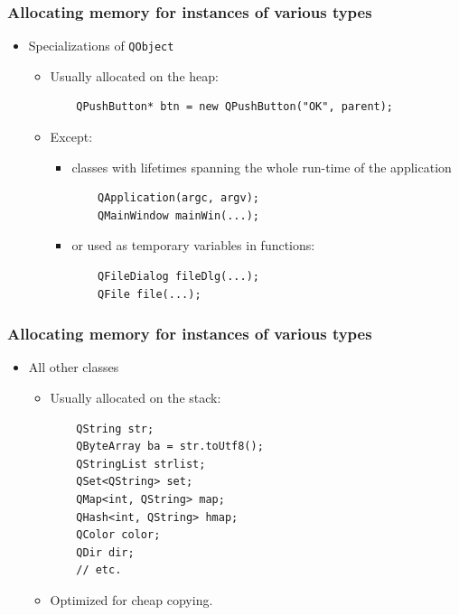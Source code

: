 \begin{frame}[fragile]
  \frametitle{Allocating memory for instances of various types}
  \small
  \begin{itemize}
    \item Specializations of \texttt{QObject}
    \begin{itemize}
      \item Usually allocated on the heap:
      \begin{verbatim}
	QPushButton* btn = new QPushButton("OK", parent);
      \end{verbatim}
      \item Except:
      \begin{itemize}
        \item classes with lifetimes spanning the whole run-time of the
        application 
        \begin{verbatim}
	QApplication(argc, argv);
	QMainWindow mainWin(...);
        \end{verbatim}
        \item or used as temporary variables in functions:
        \begin{verbatim}
	QFileDialog fileDlg(...);
	QFile file(...);
        \end{verbatim}
      \end{itemize}
    \end{itemize}
  \end{itemize}
\end{frame}

\begin{frame}[fragile]
  \frametitle{Allocating memory for instances of various types}
  \begin{itemize}
    \item All other classes
    \begin{itemize}
      \item Usually allocated on the stack:
      \begin{verbatim}
	QString str;
	QByteArray ba = str.toUtf8();
	QStringList strlist;
	QSet<QString> set;
	QMap<int, QString> map;
	QHash<int, QString> hmap;
	QColor color;
	QDir dir;
	// etc.
      \end{verbatim}
      \item Optimized for cheap copying.
    \end{itemize}
  \end{itemize}
\end{frame}

